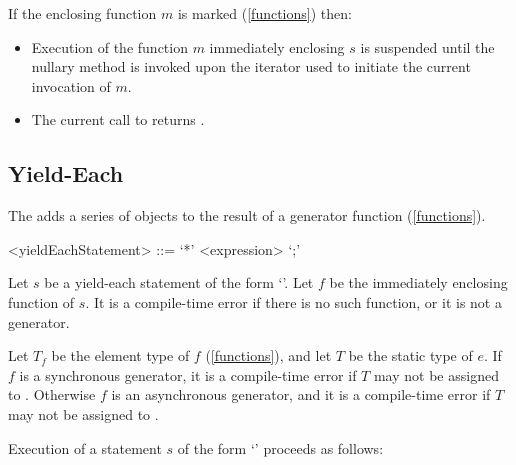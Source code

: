 \documentclass[makeidx]{article}
\begin{document}
{

\LMHash{}%
If the enclosing function $m$ is marked \code{\SYNC*} (\ref{functions}) then:
\begin{itemize}
\item
  Execution of the function $m$ immediately enclosing $s$ is suspended
  until the nullary method  is invoked upon
  the iterator used to initiate the current invocation of $m$.
\item
  The current call to  returns \TRUE.
\end{itemize}


\subsection{Yield-Each}

\LMHash{}%
The  adds a series of objects to
the result of a generator function
(\ref{functions}).

\begin{grammar}
<yieldEachStatement> ::= \YIELD{} `*' <expression> `;'
\end{grammar}

\LMHash{}%
Let $s$ be a yield-each statement of the form `'.
Let $f$ be the immediately enclosing function of $s$.
It is a compile-time error if there is no such function,
or it is not a generator.

\LMHash{}%
Let $T_f$ be the element type of $f$
(\ref{functions}),
and let $T$ be the static type of $e$.
If $f$ is a synchronous generator,
it is a compile-time error if $T$ may not be assigned to
.
Otherwise $f$ is an asynchronous generator,
and it is a compile-time error if $T$ may not be assigned to
.

\LMHash{}%
Execution of a statement $s$ of the form `'
proceeds as follows:

}
\end{document}
